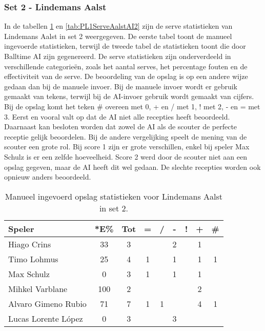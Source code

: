 \subsubsection{Set 2 - Lindemans Aalst}
\label{sec:PL1_Aalst2}
In de tabellen \ref{tab:PL1ServeAalstMan2} en \ref{tab:PL1ServeAalstAI2} zijn de serve statistieken van Lindemans Aalst in set 2 weergegeven. De eerste tabel toont de manueel ingevoerde statistieken, terwijl de tweede tabel de statistieken toont die door Balltime AI zijn gegenereerd. De serve statistieken zijn onderverdeeld in verschillende categorieën, zoals het aantal serves, het percentage fouten en de effectiviteit van de serve. De beoordeling van de opslag is op een andere wijze gedaan dan bij de manuele invoer. Bij de manuele invoer wordt er gebruik gemaakt van tekens, terwijl bij de AI-invoer gebruik wordt gemaakt van cijfers. Bij de opslag komt het teken \# overeen met 0, + en / met 1, ! met 2, - en = met 3. Eerst en vooral valt op dat de AI niet alle recepties heeft beoordeeld. Daarnaast kan besloten worden dat zowel de AI als de scouter de perfecte receptie gelijk beoordelen. Bij de andere vergelijking speelt de mening van de scouter een grote rol. Bij score 1 zijn er grote verschillen, enkel bij speler Max Schulz is er een zelfde hoeveelheid. Score 2 werd door de scouter niet aan een opslag gegeven, maar de AI heeft dit wel gedaan. De slechte recepties worden ook opnieuw anders beoordeeld.

\begin{table}[ht!]
  \centering
  \scriptsize
    \begin{tabular}{|l|c|c|c|c|c|c|c|c|} \hline
      \textbf{Speler} & *E\% & Tot & = & / & - & ! & + & \# \\ \hline
      Hiago Crins & 33 & 3 &  &  & 2 &  & 1 & \\ 
      Timo Lohmus & 25 & 4 & 1 &  & 1 & & 1 & 1 \\ 
      Max Schulz & 0 & 3 & 1 &  & 1 &  & 1 &  \\ 
      Mihkel Varblane & 100 & 2 &  &  &  &  & 2 & \\
      Alvaro Gimeno Rubio & 71 & 7 & 1 & 1 &  &  & 4 & 1\\
      Lucas Lorente López & 0 & 3 &  &  & 3 &  &  &  \\ \hline
  \end{tabular}
  \caption[Manueel ingevoerd opslag statistieken voor Lindemans Aalst in set 2]{\label{tab:PL1ServeAalstMan2}Manueel ingevoerd opslag statistieken voor Lindemans Aalst in set 2.}
\end{table}

